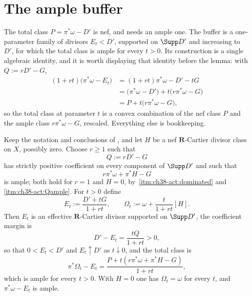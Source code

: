 \section{The ample buffer}
\label{sec:ch38-buffer}

The total class $P=\pi^*\omega-D'$ is nef, and
 needs an ample one.  The buffer is a
one-parameter family of divisors $E_t<D'$, supported on
$\Supp D'$ and increasing to $D'$, for which the total class is ample
for every $t>0$.  Its construction is a single algebraic identity, and
it is worth displaying that identity before the lemma: with
$Q:=rD'-G$,
\[
 \begin{aligned}
  (1+rt)\bigl(\pi^*\omega-E_t\bigr)
   &=(1+rt)\pi^*\omega-D'-tG\\
   &=\bigl(\pi^*\omega-D'\bigr)
     +t\bigl(r\pi^*\omega-G\bigr)\\
   &=P+t\bigl(r\pi^*\omega-G\bigr),
 \end{aligned}
\]
so the total class at parameter $t$ is a convex combination of the nef
class $P$ and the ample class $r\pi^*\omega-G$, rescaled.  Everything
else is bookkeeping.

\begin{lemma}
\label{lem:ch38-buffer}
Keep the notation and conclusions of , and let
$H$ be a nef $\mathbf R$-Cartier divisor class on $X$, possibly zero.
Choose $r\geq1$ such that
\[
                              Q:=rD'-G
\tag{38.29}\label{eq:bj-buffer-Q}
\]
has strictly positive coefficient on every component of $\Supp D'$ and
such that
\[
                         r\pi^*\omega+\pi^*H-G
\tag{38.30}\label{eq:bj-buffer-ample-divisor}
\]
is ample; both hold for $r=1$ and $H=0$, by
\,\cref{itm:ch38-act:dominated} and
\cref{itm:ch38-act:Qample}.  For $t>0$ define
\[
 E_t:=\frac{D'+tG}{1+rt},\qquad
 \Omega_t:=\omega+\frac{t}{1+rt}[H].
\tag{38.31}\label{eq:bj-buffer-path}
\]
Then $E_t$ is an effective $\mathbf R$-Cartier divisor supported on
$\Supp D'$, the coefficient margin is
\[
                         D'-E_t=\frac{tQ}{1+rt}>0,
\tag{38.32}\label{eq:bj-buffer-margin}
\]
so that $0<E_t<D'$ and $E_t\uparrow D'$ as $t\downarrow0$, and the
total class is
\[
 \pi^*\Omega_t-E_t
 =\frac{P+t(r\pi^*\omega+\pi^*H-G)}{1+rt},
\tag{38.33}\label{eq:bj-buffer-ample-total}
\]
which is ample for every $t>0$.  With $H=0$ one has
$\Omega_t=\omega$ for every $t$, and
$\pi^*\omega-E_t$ is ample.
\end{lemma}

